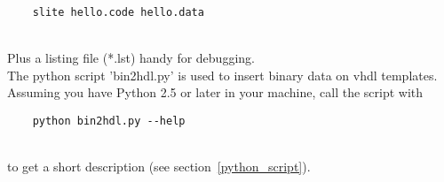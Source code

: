 \documentclass[11pt]{article}
\begin{document}
    \begin{verbatim}
    slite hello.code hello.data
    \end{verbatim}\\

    Plus a listing file (*.lst) handy for debugging.\\


    The python script 'bin2hdl.py' is used to insert binary data on vhdl templates.
    Assuming you have Python 2.5 or later in your machine, call the script with

    \begin{verbatim}
    python bin2hdl.py --help
    \end{verbatim}\\

    to get a short description (see section~\ref{python_script}).
    
\end{document}
